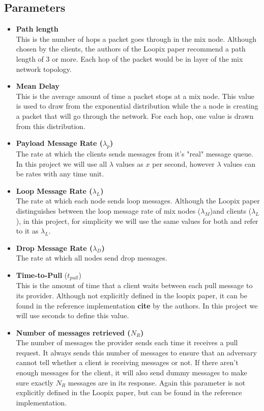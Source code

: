 \documentclass[a4paper,11pt,oneside]{report}
\begin{document}
\subsection{Parameters}
\begin{itemize}
\item \textbf{Path length} \\
This is the number of hops a packet goes through in the mix node. Although chosen by the clients, the authors of the Loopix paper recommend a path length of 3 or more. Each hop of the packet would be in layer of the mix network topology.
\item \textbf{Mean Delay} \\
This is the average amount of time a packet stops at a mix node. This value is used to draw from the exponential distribution while the a node is creating a packet that will go through the network. For each hop, one value is drawn from this distribution.
\item \textbf{Payload Message Rate (\(\lambda_p\))} \\
The rate at which the clients sends messages from it's "real" message queue. In this project we will use all \(\lambda\) values as \(x\) per second, however \(\lambda\) values can be rates with any time unit.
\item \textbf{Loop Message Rate (\(\lambda_L\))} \\ 
The rate at which each node sends loop messages. Although the Loopix paper distinguishes between the loop message rate of mix nodes (\(\lambda_M\))and clients (\(\lambda_L\)), in this project, for simplicity we will use the same values for both and refer to it as \(\lambda_L\).
\item \textbf{Drop Message Rate  (\(\lambda_D\))} \\
The rate at which all nodes send drop messages. 
\item \textbf{Time-to-Pull} (\(t_{pull}\))\\
This is the amount of time that a client waits between each pull message to its provider. Although not explicitly defined in the loopix paper, it can be found in the reference implementation \textbf{cite} by the authors. In this project we will use seconds to define this value.
\item \textbf{Number of messages retrieved (\(N_R\))} \\
The number of messages the provider sends each time it receives a pull request. It always sends this number of messages to ensure that an adversary cannot tell whether a client is receiving messages or not. If there aren't enough messages for the client, it will also send dummy messages to make sure exactly \(N_R\) messages are in its response. Again this parameter is not explicitly defined in the Loopix paper, but can be found in the reference implementation.


\end{itemize}
\end{document}
